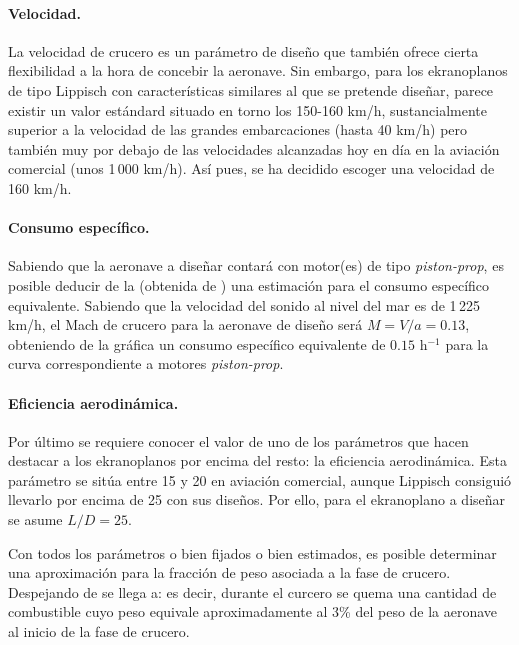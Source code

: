 \paragraph{Velocidad.} La velocidad de crucero es un parámetro de diseño que también ofrece cierta flexibilidad a la hora de concebir la aeronave. Sin embargo, para los ekranoplanos de tipo Lippisch con características similares al que se pretende diseñar, parece existir un valor estándard situado en torno los 150-160 km/h, sustancialmente superior a la velocidad de las grandes embarcaciones (hasta 40 km/h) pero también muy por debajo de las velocidades alcanzadas hoy en día en la aviación comercial (unos 1\,000 km/h). Así pues, se ha decidido escoger una velocidad de 160 km/h.

\paragraph{Consumo específico.} Sabiendo que la aeronave a diseñar contará con motor(es) de tipo \emph{piston-prop}, es posible deducir de la  (obtenida de \cite{ref:raymer}) una estimación para el consumo específico equivalente. Sabiendo que la velocidad del sonido al nivel del mar es de 1\,225 km/h, el Mach de crucero para la aeronave de diseño será $M=V/a=0.13$, obteniendo de la gráfica un consumo específico equivalente de $0.15$ h$^{-1}$ para la curva correspondiente a motores \emph{piston-prop}.

\paragraph{Eficiencia aerodinámica.} Por último se requiere conocer el valor de uno de los parámetros que hacen destacar a los ekranoplanos por encima del resto: la eficiencia aerodinámica. Esta parámetro se sitúa entre 15 y 20 en aviación comercial, aunque Lippisch consiguió llevarlo por encima de 25 con sus diseños. Por ello, para el ekranoplano a diseñar se asume $L/D = 25$.

Con todos los parámetros o bien fijados o bien estimados, es posible determinar una aproximación para la fracción de peso asociada a la fase de crucero. Despejando de  se llega a:
es decir, durante el curcero se quema una cantidad de combustible cuyo peso equivale aproximadamente al 3\% del peso de la aeronave al inicio de la fase de crucero.

